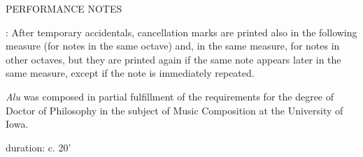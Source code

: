 \documentclass[11pt]{article}
\begin{document}
\begin{center}
\huge PERFORMANCE NOTES
\end{center}
\begingroup
\begin{center}

 : After temporary accidentals, cancellation marks are printed also in the following measure (for notes in the same octave) and, in the same measure, for notes in other octaves, but they are printed again if the same note appears later in the same measure, except if the note is immediately repeated.
\rightskip\leftskip
\phantom{text} \hfill \phantom{()}


\end{center}
\endgroup

\vspace*{9\baselineskip}

\begin{center}
\textit{Alu} was composed in partial fulfillment of the requirements for the degree of Doctor of Philosophy in the subject of Music Composition at the University of Iowa.
\end{center}

\vspace*{23\baselineskip}

\begin{center}
duration: c. 20'
\end{center}
\end{document}

